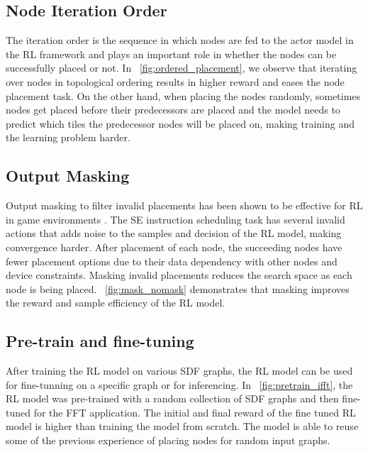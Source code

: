 \subsection{Node Iteration Order}

The iteration order is the sequence in which nodes are fed to the actor model in the RL framework and plays an important role in whether the nodes can be successfully placed or not. 
In \figurename~\ref{fig:ordered_placement}, we observe that iterating over nodes in topological ordering results in higher reward and eases the node placement task. 
On the other hand, when placing the nodes randomly, sometimes nodes get placed before their predecessors are placed and the model needs to predict which tiles the predecessor nodes will be placed on, making training and the learning problem harder.

\subsection{Output Masking}
\label{subsec:output_masking}
Output masking to filter invalid placements has been shown to be effective for RL in game environments \cite{Shengyi_mask}. 
The SE instruction scheduling task has several invalid actions that adds noise to the samples and decision of the RL model, making convergence harder. 
After placement of each node, the succeeding nodes have fewer placement options due to their data dependency with other nodes and device constraints.
Masking invalid placements reduces the search space as each node is being placed. 
\figurename~\ref{fig:mask_nomask} demonstrates that masking improves the reward and sample efficiency of the RL model.

\subsection{Pre-train and fine-tuning}
After training the RL model on various SDF graphs, the RL model can be used for fine-tunning on a specific graph or for inferencing.
In \figurename~\ref{fig:pretrain_ifft}, the RL model was pre-trained with a random collection of SDF graphs and then fine-tuned for the FFT application.
The initial and final reward of the fine tuned RL model is higher than training the model from scratch.
The model is able to reuse some of the previous experience of placing nodes for random input graphs.